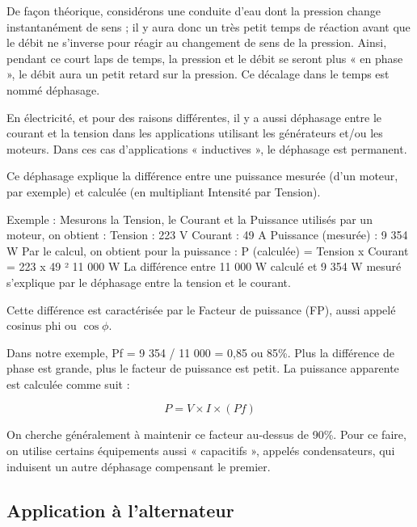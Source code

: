 De façon théorique, considérons une conduite d’eau dont la pression change instantanément de sens ; il y aura donc un très petit temps de réaction avant que le débit ne s’inverse pour réagir au changement de sens de la pression. Ainsi, pendant ce court laps de temps, la pression et le débit se seront plus « en phase », le débit aura un petit retard sur la pression. Ce décalage dans le temps est nommé déphasage.
\vspace{0.3cm}

En électricité, et pour des raisons différentes, il y a aussi déphasage entre le courant et la tension dans les applications utilisant les générateurs et/ou les moteurs. Dans ces cas d’applications « inductives », le déphasage est permanent.
\vspace{0.3cm}

Ce déphasage explique la différence entre une puissance mesurée (d’un moteur, par exemple) et calculée (en multipliant Intensité par Tension).
\vspace{0.3cm}

Exemple : Mesurons la Tension, le Courant et la Puissance utilisés par un moteur, on obtient :
		Tension : 223 V
		Courant : 49 A
		Puissance (mesurée) : 9 354 W
Par le calcul, on obtient pour la puissance : 
P (calculée) = Tension x Courant = 223 x 49 ² 11 000 W
La différence entre 11 000 W calculé et 9 354 W mesuré s’explique par le déphasage entre la tension et le courant.


 
Cette différence est caractérisée par le Facteur de puissance (FP), aussi appelé cosinus phi ou $ \cos \phi $.
\vspace{0.3cm}

Dans notre exemple, Pf = 9 354 / 11 000 = 0,85 ou 85\%.
Plus la différence de phase est grande, plus le facteur de puissance est petit.
La puissance apparente est calculée comme suit : 



\[
P = V \times I \times (Pf)
\]


On cherche généralement à maintenir ce facteur au-dessus de 90\%. Pour ce faire, on utilise certains équipements aussi « capacitifs », appelés condensateurs, qui induisent un autre déphasage compensant le premier.


\subsection{Application à l’alternateur}

